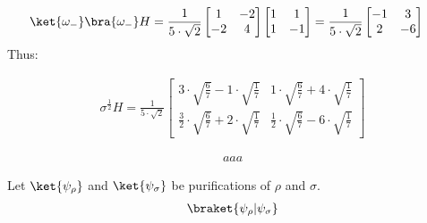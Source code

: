 \documentclass[12pt,a4paper]{article}
\begin{document}
\begin{enumerate}
\begin{equation*}
\begin{split}
        \ket{\omega_{-}}\bra{\omega_{-}}H &= \frac{1}{5 \cdot \sqrt{2} } \begin{bmatrix} 1 & -2 \\ -2  & 4 \end{bmatrix} \begin{bmatrix} 1 & 1 \\ 1 & - 1 \end{bmatrix} =\frac{1}{5 \cdot \sqrt{2}} \begin{bmatrix}  -1 & 3 \\  2 & -6 \end{bmatrix}
      \end{split}
    \end{equation*}
    Thus: 

    \begin{equation*}
      \begin{split}
      \sigma^{\frac{1}{2}}H = \frac{1}{5 \cdot \sqrt{2} }    \begin{bmatrix}  3 \cdot  \sqrt{\frac{6}{7}} - 1  \cdot  \sqrt{\frac{1}{7}} & 1  \cdot  \sqrt{\frac{6}{7}} + 4  \cdot  \sqrt{\frac{1}{7}}\\  \frac{3}{2}  \cdot  \sqrt{\frac{6}{7}} + 2 \cdot  \sqrt{\frac{1}{7}}  & \frac{1}{2}  \cdot  \sqrt{\frac{6}{7}} -6   \cdot  \sqrt{\frac{1}{7}}\end{bmatrix}      
      \end{split}
    \end{equation*}



    \begin{equation*}
      \begin{split}
          aaa
      \end{split}
    \end{equation*}

    Let $\ket{\psi_\rho}$ and $\ket{\psi_\sigma}$ be purifications of $\rho$ and $\sigma$.  
    \begin{equation*}
      \begin{split}
        \braket{\psi_{\rho}| \psi_{\sigma}} 
      \end{split}
    \end{equation*}
\end{enumerate}
\printbibliography 
\end{document}
